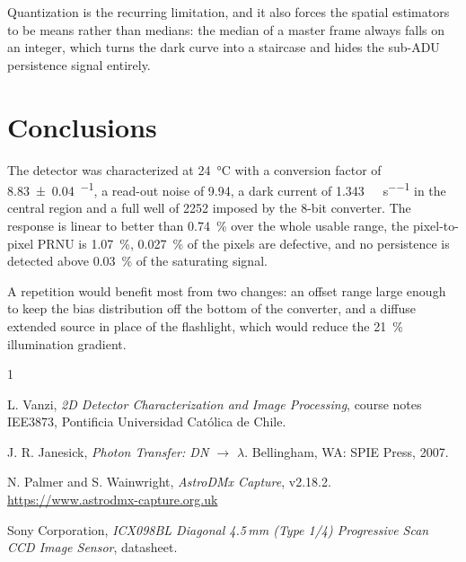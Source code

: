 \documentclass[conference]{IEEEtran}
\begin{document}
Quantization is the recurring limitation, and it also forces the spatial estimators to be means rather than medians: the median of a master frame always falls on an integer, which turns the dark curve into a staircase and hides the sub-ADU persistence signal entirely.

\section{Conclusions}
\label{sec:concl}

The detector was characterized at \SI{24}{\celsius} with a conversion factor of \num{8.83 \pm 0.04}\si{\electron\per\adu}, a read-out noise of \SI{9.94}{\electron}, a dark current of \SI{1.343}{\electron\per\pixel\per\second} in the central region and a full well of \SI{2252}{\electron} imposed by the 8-bit converter. The response is linear to better than \SI{0.74}{\percent} over the whole usable range, the pixel-to-pixel PRNU is \SI{1.07}{\percent}, \SI{0.027}{\percent} of the pixels are defective, and no persistence is detected above \SI{0.03}{\percent} of the saturating signal.

A repetition would benefit most from two changes: an offset range large enough to keep the bias distribution off the bottom of the converter, and a diffuse extended source in place of the flashlight, which would reduce the \SI{21}{\percent} illumination gradient.

\begin{thebibliography}{1}

L. Vanzi, \emph{2D Detector Characterization and Image Processing}, course
notes IEE3873, Pontificia Universidad Cat\'olica de Chile.

J. R. Janesick, \emph{Photon Transfer: DN $\rightarrow$ $\lambda$}.
Bellingham, WA: SPIE Press, 2007.

N. Palmer and S. Wainwright, \emph{AstroDMx Capture}, v2.18.2.
\url{https://www.astrodmx-capture.org.uk}

Sony Corporation, \emph{ICX098BL Diagonal 4.5\,mm (Type 1/4) Progressive Scan
CCD Image Sensor}, datasheet.

\end{thebibliography}
\end{document}
